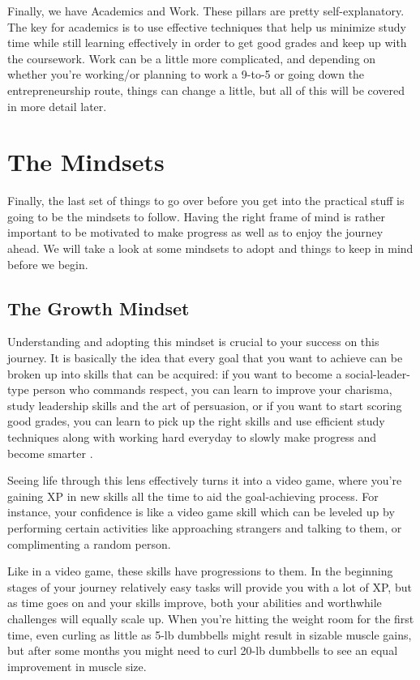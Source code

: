 \documentclass[
]{book}
\begin{document}
Finally, we have Academics and Work. These pillars are pretty self-explanatory. The key for academics is to use effective techniques that help us minimize study time while still learning effectively in order to get good grades and keep up with the coursework. Work can be a little more complicated, and depending on whether you're working/or planning to work a 9-to-5 or going down the entrepreneurship route, things can change a little, but all of this will be covered in more detail later.

\hypertarget{the-mindsets}{%
\chapter{The Mindsets}\label{the-mindsets}}

Finally, the last set of things to go over before you get into the practical stuff is going to be the mindsets to follow. Having the right frame of mind is rather important to be motivated to make progress as well as to enjoy the journey ahead. We will take a look at some mindsets to adopt and things to keep in mind before we begin.

\hypertarget{the-growth-mindset}{%
\section{The Growth Mindset}\label{the-growth-mindset}}

Understanding and adopting this mindset is crucial to your success on this journey. It is basically the idea that every goal that you want to achieve can be broken up into skills that can be acquired: if you want to become a social-leader-type person who commands respect, you can learn to improve your charisma, study leadership skills and the art of persuasion, or if you want to start scoring good grades, you can learn to pick up the right skills and use efficient study techniques along with working hard everyday to slowly make progress and become smarter \citep{growth_mindset}.

Seeing life through this lens effectively turns it into a video game, where you're gaining XP in new skills all the time to aid the goal-achieving process. For instance, your confidence is like a video game skill which can be leveled up by performing certain activities like approaching strangers and talking to them, or complimenting a random person.

Like in a video game, these skills have progressions to them. In the beginning stages of your journey relatively easy tasks will provide you with a lot of XP, but as time goes on and your skills improve, both your abilities and worthwhile challenges will equally scale up. When you're hitting the weight room for the first time, even curling as little as 5-lb dumbbells might result in sizable muscle gains, but after some months you might need to curl 20-lb dumbbells to see an equal improvement in muscle size.
\end{document}
